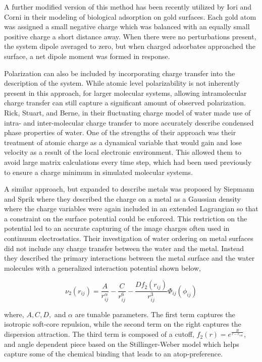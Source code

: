 A further modified version of this method has been recently utilized by Iori
and Corni in their modeling of biological adsorption on gold
surfaces.\citep{Iori:2008ic, Iori:2009au} Each gold atom was assigned a small
negative charge which was balanced with an equally small positive charge a
short distance away. When there were no perturbations present, the system
dipole averaged to zero, but when charged adsorbates approached the surface, a
net dipole moment was formed in response.

Polarization can also be included by incorporating charge transfer into the
description of the system. While atomic level polarizability is not inherently
present in this approach, for larger molecular systems, allowing
intramolecular charge transfer can still capture a significant amount of
observed polarization. Rick, Stuart, and Berne, in their fluctuating charge
model of water made use of intra- and inter-molecular charge transfer to more
accurately describe condensed phase properties of water.\citep{Rick:1994ss} One of the
strengths of their approach was their treatment of atomic charge as a dynamical
variable that would gain and lose velocity as a result of the local electronic
environment. This allowed them to avoid large matrix calculations every time
step, which had been used previously to ensure a charge minimum in simulated
molecular systems. 

A similar approach, but expanded to describe metals was proposed by Siepmann
and Sprik where they described the charge on a metal as a Gaussian density
where the charge variables were again included in an extended Lagrangian so
that a constraint on the surface potential could be
enforced.\citep{Siepmann:1995es} This restriction on the potential led to an
accurate capturing of the image charges often used in continuum
electrostatics. Their investigation of water ordering on metal surfaces did not
include any charge transfer between the water and the metal. Instead they
described the primary interactions between the metal surface and the water
molecules with a generalized interaction potential shown below,

\begin{equation}
\nu_2(r_{ij}) = \frac{A}{r_{ij}^\alpha} - \frac{C}{r_{ij}^6} - \frac{Df_2(r_{ij})}{r_{ij}^3}\Phi_{ij}(\phi_{ij})
\end{equation}

where, $A, C, D, $ and $\alpha$ are tunable parameters. The first term captures
the isotropic soft-core repulsion, while the second term on the right captures
the dispersion attraction. The third term is composed of a cutoff, $f_2(r) =
e^{\frac{B}{r-r_{\mathrm{cut}}}}$, and angle dependent piece based on the
Stillinger-Weber model\citep{Stillinger:1985tb} which helps capture some of the
chemical binding that leads to an atop-preference.

